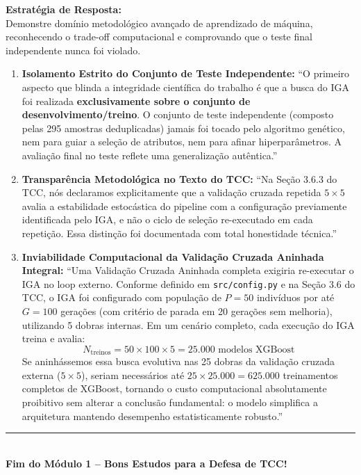 \documentclass[11pt,a4paper]{article}
\begin{document}
\begin{boardAnswer}
\textbf{Estratégia de Resposta:}\\
Demonstre domínio metodológico avançado de aprendizado de máquina, reconhecendo o trade-off computacional e comprovando que o teste final independente nunca foi violado.

\begin{enumerate}[leftmargin=0.8cm]
  \item \textbf{Isolamento Estrito do Conjunto de Teste Independente:} ``O primeiro aspecto que blinda a integridade científica do trabalho é que a busca do IGA foi realizada \textbf{exclusivamente sobre o conjunto de desenvolvimento/treino}. O conjunto de teste independente (composto pelas 295 amostras deduplicadas) jamais foi tocado pelo algoritmo genético, nem para guiar a seleção de atributos, nem para afinar hiperparâmetros. A avaliação final no teste reflete uma generalização autêntica.''
  \item \textbf{Transparência Metodológica no Texto do TCC:} ``Na Seção 3.6.3 do TCC, nós declaramos explicitamente que a validação cruzada repetida $5 \times 5$ avalia a estabilidade estocástica do pipeline com a configuração previamente identificada pelo IGA, e não o ciclo de seleção re-executado em cada repetição. Essa distinção foi documentada com total honestidade técnica.''
  \item \textbf{Inviabilidade Computacional da Validação Cruzada Aninhada Integral:} ``Uma Validação Cruzada Aninhada completa exigiria re-executar o IGA no loop externo. Conforme definido em \texttt{src/config.py} e na Seção 3.6 do TCC, o IGA foi configurado com população de $P = 50$ indivíduos por até $G = 100$ gerações (com critério de parada em 20 gerações sem melhoria), utilizando 5 dobras internas. Em um cenário completo, cada execução do IGA treina e avalia:
  \begin{equation}
    N_{\text{treinos}} = 50 \times 100 \times 5 = 25.000 \text{ modelos XGBoost}
  \end{equation}
  Se aninhássemos essa busca evolutiva nas 25 dobras da validação cruzada externa ($5 \times 5$), seriam necessários até $25 \times 25.000 = 625.000$ treinamentos completos de XGBoost, tornando o custo computacional absolutamente proibitivo sem alterar a conclusão fundamental: o modelo simplifica a arquitetura mantendo desempenho estatisticamente robusto.''
\end{enumerate}
\end{boardAnswer}

\vspace{0.6cm}
\begin{center}
  \rule{0.6\textwidth}{0.8pt}\\[0.2cm]
  \small\textbf{\textsf{Fim do Módulo 1 -- Bons Estudos para a Defesa de TCC!}}
\end{center}
\end{document}
